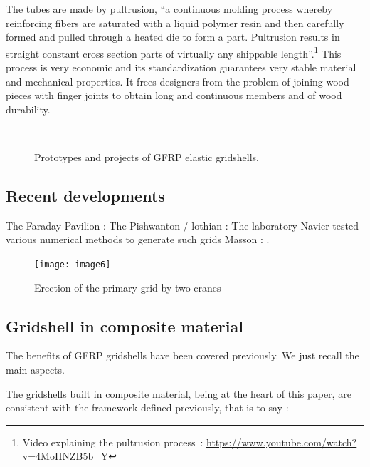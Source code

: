The tubes are made by pultrusion, \enquote{a continuous molding process whereby reinforcing fibers are saturated with a liquid polymer resin and then carefully formed and pulled through a heated die to form a part. Pultrusion results in straight constant cross section parts of virtually any shippable length}.\footnote{Video explaining the pultrusion process~: \url{https://www.youtube.com/watch?v=4MoHNZB5b_Y}} This process is very economic and its standardization guarantees very stable material and mechanical properties. It frees designers from the problem of joining wood pieces with finger joints to obtain long and continuous members and of wood durability.

\begin{figure}[h]
	\centering
		\captionsetup[subfloat]{captionskip=10pt}
		\\ \vspace{1cm}
		\vspace{10pt}
		\caption{Prototypes and projects of GFRP elastic gridshells.}
		\label{fig:proto}    
\end{figure}




\subsection{Recent developments}
The Faraday Pavilion : \cite{Nicholas2013}
The Pishwanton / lothian : \cite{Pishwanton2003}
The laboratory Navier tested various numerical methods to generate such grids \cite{Bouhaya2009}
Masson :  \cite{Masson2017}.
\begin{figure}[t]
	\centering
		\texttt{[image: image6]}
	\caption{Erection of the primary grid by two cranes}
	\label{fig:5}
\end{figure}



\subsection{Gridshell in composite material}

The benefits of GFRP gridshells have been covered previously. We just recall the main aspects.

The gridshells built in composite material, being at the heart of this paper, are consistent with the framework defined previously, that is to say :


